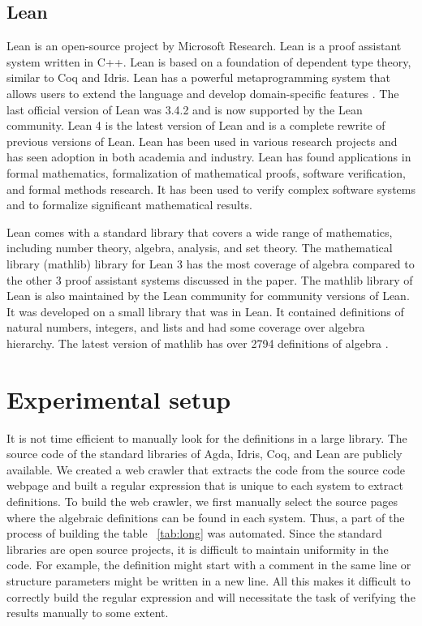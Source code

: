 \subsection{Lean}

Lean \cite{de2015lean} is an open-source project by Microsoft Research. Lean is
a proof assistant system written in C++. Lean is based on a foundation of
dependent type theory, similar to Coq and Idris. Lean has a powerful
metaprogramming system that allows users to extend the language and develop
domain-specific features \cite{ebner2017metaprogramming}. The last official
version of Lean was 3.4.2 and is now supported by the Lean community. Lean 4 is
the latest version of Lean and is a complete rewrite of previous versions of
Lean. Lean has been used in various research projects and has seen adoption in
both academia and industry. Lean has found applications in formal mathematics,
formalization of mathematical proofs, software verification, and formal methods
research. It has been used to verify complex software systems and to formalize
significant mathematical results.

Lean comes with a standard library that covers a wide range of mathematics,
including number theory, algebra, analysis, and set theory. The mathematical
library (mathlib) \cite{10.1145/3372885.3373824} library for Lean 3 has the most
coverage of algebra compared to the other 3 proof assistant systems discussed in
the paper. The mathlib library of Lean is also maintained by the Lean community
for community versions of Lean. It was developed on a small library that was in
Lean. It contained definitions of natural numbers, integers, and lists and had
some coverage over algebra hierarchy. The latest version of mathlib has over
2794 definitions of algebra \cite{2019arXiv191203028S}. 

\section{Experimental setup}
\label{experiment}
It is not time efficient to manually look for the definitions in a large
library. The source code of the standard libraries of Agda, Idris, Coq, and Lean
are publicly available. We created a web crawler that extracts the code from the
source code webpage and built a regular expression that is unique to each system
to extract definitions. To build the web crawler, we first manually select the
source pages where the algebraic definitions can be found in each system.  Thus,
a part of the process of building the table ~\ref{tab:long} was automated. Since
the standard libraries are open source projects, it is difficult to maintain
uniformity in the code. For example, the definition might start with a comment
in the same line or structure parameters might be written in a new line. All
this makes it difficult to correctly build the regular expression and will
necessitate the task of verifying the results manually to some extent.   

